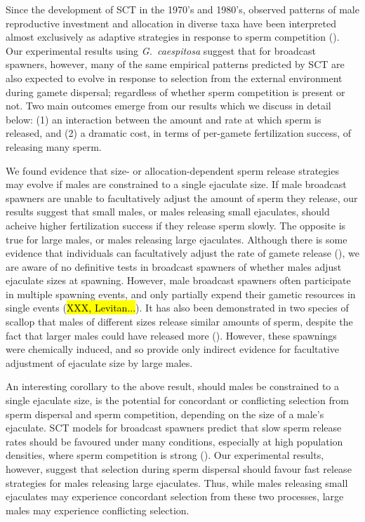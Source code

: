 \documentclass{article}
\begin{document}
Since the development of SCT in the 1970's and 1980's, observed patterns of male reproductive investment and allocation in diverse taxa have been interpreted almost exclusively as adaptive strategies in response to sperm competition (\citealt{Parker1972,Parker1982,Wedell2002}). Our experimental results using \textit{G.~caespitosa} suggest that for broadcast spawners, however, many of the same empirical patterns predicted by SCT are also expected to evolve in response to selection from the external environment during gamete dispersal; regardless of whether sperm competition is present or not. Two main outcomes emerge from our results which we discuss in detail below: (1) an interaction between the amount and rate at which sperm is released, and (2) a dramatic cost, in terms of per-gamete fertilization success, of releasing many sperm.

We found evidence that size- or allocation-dependent sperm release strategies may evolve if males are constrained to a single ejaculate size. If male broadcast spawners are unable to facultatively adjust the amount of sperm they release, our results suggest that small males, or males releasing small ejaculates, should acheive higher fertilization success if they release sperm slowly. The opposite is true for large males, or males releasing large ejaculates. Although there is some evidence that individuals can facultatively adjust the rate of gamete release (\citealt{Marshall2004}), we are aware of no definitive tests in broadcast spawners of whether males adjust ejaculate sizes at spawning. However, male broadcast spawners often participate in multiple spawning events, and only partially expend their gametic resources in single events (\hl{XXX, Levitan...}). It has also been demonstrated in two species of scallop that males of different sizes release similar amounts of sperm, despite the fact that larger males could have released more (\citealt{Styan2003}). However, these spawnings were chemically induced, and so provide only indirect evidence for facultative adjustment of ejaculate size by large males. 

An interesting corollary to the above result, should males be constrained to a single ejaculate size, is the potential for concordant or conflicting selection from sperm dispersal and sperm competition, depending on the size of a male's ejaculate. SCT models for broadcast spawners predict that slow sperm release rates should be favoured under many conditions, especially at high population densities, where sperm competition is strong (\citealt{Olito2015, Olito2017}). Our experimental results, however, suggest that selection during sperm dispersal should favour fast release strategies for males releasing large ejaculates. Thus, while males releasing small ejaculates may experience concordant selection from these two processes, large males may experience conflicting selection.
\end{document}
